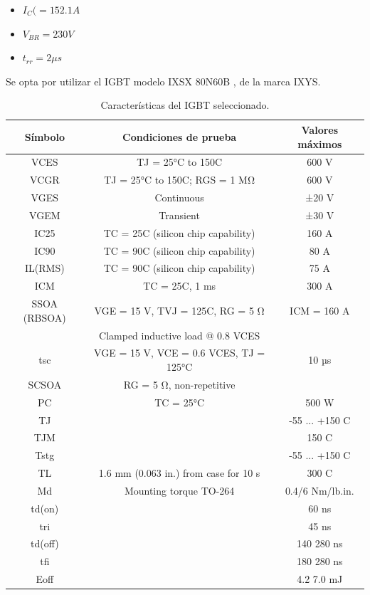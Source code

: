 \begin{itemize}
	\item $I_C(=152.1A$
	\item $V_{BR} = 230V$
	\item $t_{rr} = 2 \mu s$
\end{itemize}

Se opta por utilizar el IGBT modelo IXSX 80N60B , de la marca IXYS. 

\begin{table}[h]
	\centering
	\begin{tabular}{|c|c|c|}
		\hline
		\textbf{Símbolo} & \textbf{Condiciones de prueba} & \textbf{Valores máximos} \\ \hline
		VCES & TJ = 25°C to 150C & 600 V \\ \hline
		VCGR & TJ = 25°C to 150C; RGS = 1 MΩ & 600 V \\ \hline
		VGES & Continuous & ±20 V \\ \hline
		VGEM & Transient & ±30 V \\ \hline
		IC25 & TC = 25C (silicon chip capability) & 160 A \\ \hline
		IC90 & TC = 90C (silicon chip capability) & 80 A \\ \hline
		IL(RMS) & TC = 90C (silicon chip capability) & 75 A \\ \hline
		ICM & TC = 25C, 1 ms & 300 A \\ \hline
		SSOA (RBSOA) & VGE = 15 V, TVJ = 125C, RG = 5 Ω & ICM = 160 A \\
		& Clamped inductive load @ 0.8 VCES & \\ \hline
		tsc & VGE = 15 V, VCE = 0.6 VCES, TJ = 125°C & 10 µs \\ \hline
		SCSOA & RG = 5 Ω, non-repetitive & \\ \hline
		PC & TC = 25°C & 500 W \\ \hline
		TJ &  & -55 ... +150 C \\ \hline
		TJM &  & 150 C \\ \hline
		Tstg &  & -55 ... +150 C \\ \hline
		TL & 1.6 mm (0.063 in.) from case for 10 s & 300 C \\ \hline
		Md & Mounting torque TO-264 & 0.4/6 Nm/lb.in. \\ \hline
		td(on) &  & 60 ns \\ \hline
		tri &  & 45 ns \\ \hline
		td(off) &  & 140 280 ns \\ \hline
		tfi &  & 180 280 ns \\ \hline
		Eoff &  & 4.2 7.0 mJ \\ \hline
	\end{tabular}
	\caption{Características del IGBT seleccionado.}
	\label{tab:test_conditions}
\end{table}
\clearpage

